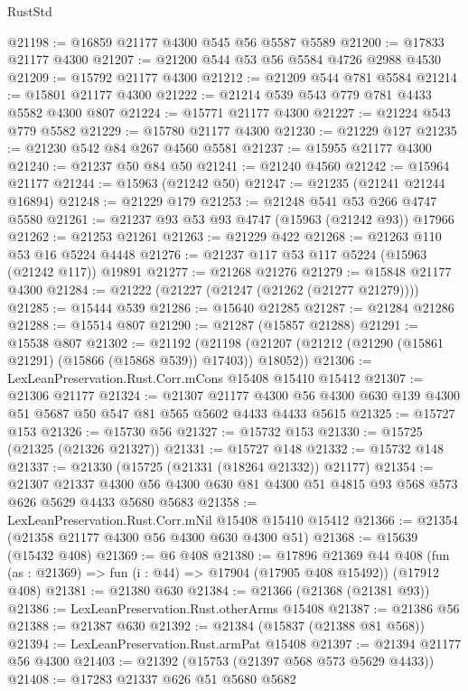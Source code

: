 \begin{lexlean}{RustStd}
\begin{coremodule}
@21198 := @16859 @21177 @4300 @545 @56 @5587 @5589
@21200 := @17833 @21177 @4300
@21207 := @21200 @544 @53 @56 @5584 @4726 @2988 @4530
@21209 := @15792 @21177 @4300
@21212 := @21209 @544 @781 @5584
@21214 := @15801 @21177 @4300
@21222 := @21214 @539 @543 @779 @781 @4433 @5582 @4300 @807
@21224 := @15771 @21177 @4300
@21227 := @21224 @543 @779 @5582
@21229 := @15780 @21177 @4300
@21230 := @21229 @127
@21235 := @21230 @542 @84 @267 @4560 @5581
@21237 := @15955 @21177 @4300
@21240 := @21237 @50 @84 @50
@21241 := @21240 @4560
@21242 := @15964 @21177
@21244 := @15963 (@21242 @50)
@21247 := @21235 (@21241 @21244 @16894)
@21248 := @21229 @179
@21253 := @21248 @541 @53 @266 @4747 @5580
@21261 := @21237 @93 @53 @93 @4747 (@15963 (@21242 @93)) @17966
@21262 := @21253 @21261
@21263 := @21229 @422
@21268 := @21263 @110 @53 @16 @5224 @4448
@21276 := @21237 @117 @53 @117 @5224 (@15963 (@21242 @117)) @19891
@21277 := @21268 @21276
@21279 := @15848 @21177 @4300
@21284 := @21222 (@21227 (@21247 (@21262 (@21277 @21279))))
@21285 := @15444 @539
@21286 := @15640 @21285
@21287 := @21284 @21286
@21288 := @15514 @807
@21290 := @21287 (@15857 @21288)
@21291 := @15538 @807
@21302 := @21192
    (@21198 (@21207 (@21212 (@21290 (@15861 @21291) (@15866 (@15868 @539)) @17403)) @18052))
@21306 := LexLeanPreservation.Rust.Corr.mCons @15408 @15410 @15412
@21307 := @21306 @21177
@21324 := @21307
    @21177
    @4300
    @56
    @4300
    @630
    @139
    @4300
    @51
    @5687
    @50
    @547
    @81
    @565
    @5602
    @4433
    @4433
    @5615
@21325 := @15727 @153
@21326 := @15730 @56
@21327 := @15732 @153
@21330 := @15725 (@21325 (@21326 @21327))
@21331 := @15727 @148
@21332 := @15732 @148
@21337 := @21330 (@15725 (@21331 (@18264 @21332)) @21177)
@21354 := @21307
    @21337
    @4300
    @56
    @4300
    @630
    @81
    @4300
    @51
    @4815
    @93
    @568
    @573
    @626
    @5629
    @4433
    @5680
    @5683
@21358 := LexLeanPreservation.Rust.Corr.mNil @15408 @15410 @15412
@21366 := @21354 (@21358 @21177 @4300 @56 @4300 @630 @4300 @51)
@21368 := @15639 (@15432 @408)
@21369 := @6 @408
@21380 := @17896
    @21369
    @44
    @408
    (fun (as : @21369) => fun (i : @44) => @17904 (@17905 @408 @15492))
    (@17912 @408)
@21381 := @21380 @630
@21384 := @21366 (@21368 (@21381 @93))
@21386 := LexLeanPreservation.Rust.otherArms @15408
@21387 := @21386 @56
@21388 := @21387 @630
@21392 := @21384 (@15837 (@21388 @81 @568))
@21394 := LexLeanPreservation.Rust.armPat @15408
@21397 := @21394 @21177 @56 @4300
@21403 := @21392 (@15753 (@21397 @568 @573 @5629 @4433))
@21408 := @17283 @21337 @626 @51 @5680 @5682

\end{coremodule}
\end{lexlean}
